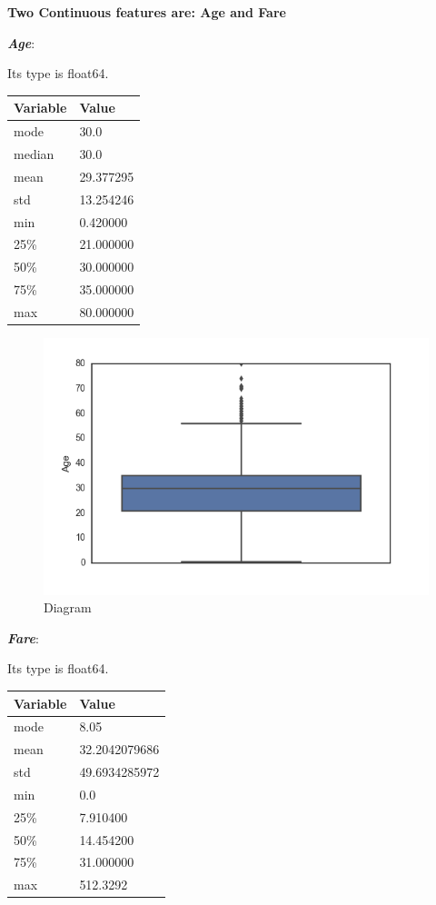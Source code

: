 \documentclass[11pt]{article}
\makeatletter
\def\maxwidth{\ifdim\Gin@nat@width>\linewidth\linewidth
    \else\Gin@nat@width\fi}
\let\Oldincludegraphics\includegraphics
\renewcommand{\includegraphics}[1]{\Oldincludegraphics[width=.8\maxwidth]{#1}}
\makeatother
\begin{document}
    \textbf{Two Continuous features are: Age and Fare}

\textbf{\emph{Age}}:

Its type is float64.

\begin{longtable}[]{@{}ll@{}}
\toprule
Variable & Value\tabularnewline
\midrule
\endhead
mode & 30.0\tabularnewline
median & 30.0\tabularnewline
mean & 29.377295\tabularnewline
std & 13.254246\tabularnewline
min & 0.420000\tabularnewline
25\% & 21.000000\tabularnewline
50\% & 30.000000\tabularnewline
75\% & 35.000000\tabularnewline
max & 80.000000\tabularnewline
\bottomrule
\end{longtable}

\begin{figure}
\centering
\includegraphics{boxplotAge.png}
\caption{Diagram}
\end{figure}

\textbf{\emph{Fare}}:

Its type is float64.

\begin{longtable}[]{@{}ll@{}}
\toprule
Variable & Value\tabularnewline
\midrule
\endhead
mode & 8.05\tabularnewline
mean & 32.2042079686\tabularnewline
std & 49.6934285972\tabularnewline
min & 0.0\tabularnewline
25\% & 7.910400\tabularnewline
50\% & 14.454200\tabularnewline
75\% & 31.000000\tabularnewline
max & 512.3292\tabularnewline
\bottomrule
\end{longtable}
\end{document}

